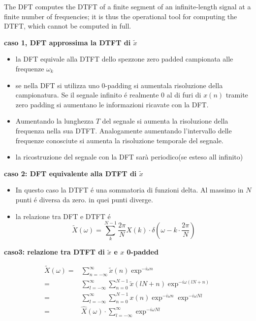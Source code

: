 \documentclass[11pt,a4paper,DIV12,BCOR1.5mm]{scrartcl}
\begin{document}
The DFT computes the DTFT of a finite segment of an infinite-length signal at a finite number of frequencies; it is thus the operational tool for computing the DTFT, which cannot be computed in full.

\textbf{caso 1, DFT approssima la DTFT di $\tilde{x}$}
\begin{itemize}
\item 
	la DFT equivale alla DTFT dello spezzone zero padded  campionata alle frequenze $\omega_k$
\item 
	se nella DFT si utilizza uno 0-padding si aumentala risoluzione della campionatura.
	Se il segnale infinito é realmente 0 al di furi di $x(n)$ tramite zero padding si aumentano le informazioni ricavate con la DFT.
\item 
	Aumentando la lunghezza $T$ del segnale si aumenta la risoluzione della frequenza nella sua DTFT. Analogamente aumentando l'intervallo delle frequenze conosciute si aumenta la risoluzione temporale del segnale. 
\item 
	la ricostruzione del segnale con la DFT sarà periodico(se esteso all infinito)

\end{itemize}

\textbf{caso 2: DFT equivalente alla DTFT di $\tilde{x}$}
\begin{itemize}
\item 
	In questo caso la DTFT é una sommatoria di funzioni delta. Al massimo in $N$ punti é diversa da zero. in quei punti diverge.
\item la relazione tra DFT e DTFT é
 	\begin{equation}
 	 \tilde X(\omega) = \sum_k^{N-1} \frac{2\pi}{N} X(k) \cdot \delta(\omega -k\cdot \frac{2\pi}{N})
 	\end{equation}

\end{itemize}

\textbf{caso3: relazione tra DTFT di $\tilde x $ e $x$ 0-padded}

\begin{align}
\tilde{X}(\omega) =& \sum_{n=-\infty}^\infty \tilde{x}(n) \exp^{-i\omega n} \\
=&  \sum_{l=-\infty}^\infty \sum_{n=0}^{N-1} \tilde{x}(lN+n) \exp^{-i\omega (lN+n)} \\
=&  \sum_{l=-\infty}^\infty \sum_{n=0}^{N-1} x(n) \exp^{-i\omega n} \exp^{-i\omega Nl} \\
=&  \hat X(\omega) \cdot \sum_{l=-\infty}^\infty    \exp^{-i\omega Nl}
\end{align}
\end{document}
